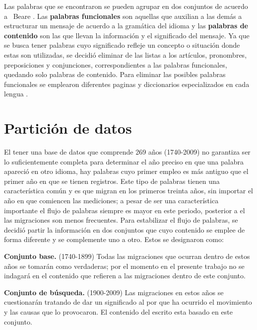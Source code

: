Las palabras que se encontraron se pueden agrupar en dos conjuntos de acuerdo
a~ Beare \cite{contenidopal}. Las \textbf{palabras funcionales} son aquellas que
auxilian a las demás a estructurar un mensaje de acuerdo a la gramática del
idioma y las \textbf{palabras de contenido} son las que llevan la información
y el significado del mensaje. Ya  que se busca tener palabras cuyo significado
refleje un concepto o situación donde estas son utilizadas, se decidió eliminar
de las listas a los artículos, pronombres, preposiciones y conjunciones,
correspondientes a las palabras funcionales, quedando solo palabras de
contenido. Para eliminar las posibles palabras funcionales se emplearon
diferentes paginas y diccionarios especializados en cada lengua
\cite{englishdic, frenchdic, germandic, italiandic, spanishdic}. 

\section{Partición de datos} %

El tener una base de datos que comprende 269 años (1740-2009) no garantiza ser
lo suficientemente completa para determinar el año preciso en que una palabra
apareció en otro idioma, hay palabras cuyo primer empleo es más antiguo que el
primer año en que se tienen registros. Este tipo de palabras tienen una
característica común y es que migran en los primeros treinta años, sin importar
el año en que comiencen las mediciones; a pesar de ser una característica
importante el flujo de palabras siempre es mayor en este periodo, posterior a
el las migraciones son menos frecuentes. Para estabilizar el flujo de palabras,
se decidió partir la información en dos conjuntos que cuyo contenido se emplee
de forma diferente y se complemente uno a otro.  Estos se designaron como:

\textbf{Conjunto base.} (1740-1899) Todas las migraciones que ocurran dentro de estos años se tomarán como verdaderas; por el momento en el presente trabajo no se indagará en el contenido que refieren a las migraciones dentro de este conjunto. 

\textbf{Conjunto de búsqueda.} (1900-2009) Las migraciones en estos años se cuestionarán tratando de dar un significado al por que ha ocurrido el
movimiento y las causas que lo provocaron. El contenido del escrito esta basado en este conjunto. 

